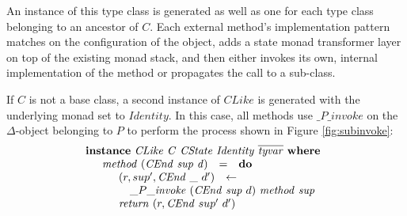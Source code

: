 An instance of this type class is generated as well as one for each type class belonging to an ancestor of $C$. Each external method's implementation pattern matches on the configuration of the object, adds a state monad transformer layer on top of the existing monad stack, and then either invokes its own, internal implementation of the method or propagates the call to a sub-class.

If $C$ is not a base class, a second instance of $\mathit{CLike}$ is generated with the underlying monad set to $\mathit{Identity}$. In this case, all methods use $\_P\_\mathit{invoke}$ on the $\Delta$-object belonging to $P$ to perform the process shown in Figure \ref{fig:subinvoke}:
\begin{displaymath}
\begin{array}{l}
\mathbf{instance}~\mathit{CLike}~\mathit{C}~\mathit{CState}~\mathit{Identity}~\overline{\mathit{tyvar}}~\mathbf{where}\\
\quad \begin{array}{lcl}
\mathit{method}~(\mathit{CEnd}~\mathit{sup}~\mathit{d}) & = & \mathbf{do} \\
\multicolumn{3}{l}{\quad \begin{array}{lcl}
    (r,sup',\mathit{CEnd}~\_~d') & \leftarrow & \\ 
    \multicolumn{3}{l}{ \quad \_P\_\mathit{invoke}~(\mathit{CEnd}~\mathit{sup}~d)~\mathit{method}~\mathit{sup} }\\
    \multicolumn{3}{l}{\mathit{return}~(r, \mathit{CEnd}~sup'~d')}
    \end{array}}
\end{array}
\end{array}
\end{displaymath}
